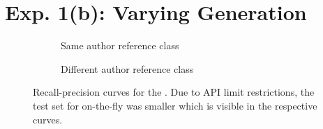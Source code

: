 \section{Exp. 1(b): Varying \Imp{} Generation}

\begin{figure}[H]
  \centering
  \begin{subfigure}{\textwidth}
    \centering
    
    \caption{Same author reference class}
    \label{fig:student_essays_same_author}
  \end{subfigure}
  \begin{subfigure}{\textwidth}
    \centering
    
    \caption{Different author reference class}
    \label{fig:student_essays_different_author}
  \end{subfigure}
  \caption[Recall-precision curves for the \dataStudent{}.]{Recall-precision curves for the \dataStudent{}. 
Due to API limit restrictions, the test set for on-the-fly was smaller which is visible in the respective curves.
  }
  \label{fig:diff_imp_gen_student_essays}
\end{figure}
